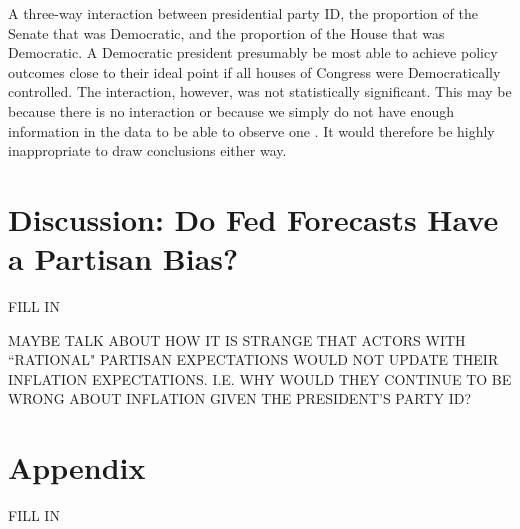 \documentclass[a4paper]{article}\usepackage{graphicx, color}
\begin{document}
A three-way interaction between presidential party ID, the proportion of the Senate that was Democratic, and the proportion of the House that was Democratic. A Democratic president presumably be most able to achieve policy outcomes close to their ideal point if all houses of Congress were Democratically controlled. The interaction, however, was not statistically significant. This may be because there is no interaction or because we simply do not have enough information in the data to be able to observe one \citep[see][]{Brambor2006}. It would therefore be highly inappropriate to draw conclusions either way.


\section*{Discussion: Do Fed Forecasts Have a Partisan Bias?}

FILL IN

MAYBE TALK ABOUT HOW IT IS STRANGE THAT ACTORS WITH ``RATIONAL" PARTISAN EXPECTATIONS WOULD NOT UPDATE THEIR INFLATION EXPECTATIONS. I.E. WHY WOULD THEY CONTINUE TO BE WRONG ABOUT INFLATION GIVEN THE PRESIDENT'S PARTY ID?


\section*{Appendix}
FILL IN




\end{document}
